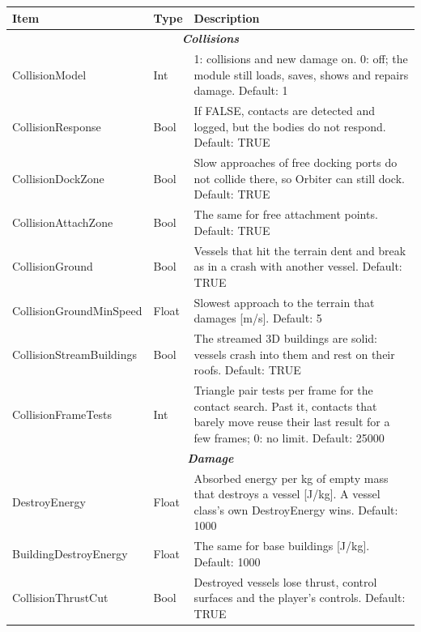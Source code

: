 \documentclass[Orbiter User Manual.tex]{subfiles}
\begin{document}
	\begin{longtable}{ |p{}|p{}|p{}| }
	\hline\rule{0pt}{2ex}
	\textbf{Item} & \textbf{Type} & \textbf{Description}\\
	\hline
	\multicolumn{3}{|c|}{\rule{0pt}{2ex}\textbf{\textit{Collisions}}}\\
	\hline\rule{0pt}{2ex}
	CollisionModel & Int & 1: collisions and new damage on. 0: off; the module still loads, saves, shows and repairs damage. Default: 1\\
	\hline\rule{0pt}{2ex}
	CollisionResponse & Bool & If FALSE, contacts are detected and logged, but the bodies do not respond. Default: TRUE\\
	\hline\rule{0pt}{2ex}
	CollisionDockZone & Bool & Slow approaches of free docking ports do not collide there, so Orbiter can still dock. Default: TRUE\\
	\hline\rule{0pt}{2ex}
	CollisionAttachZone & Bool & The same for free attachment points. Default: TRUE\\
	\hline\rule{0pt}{2ex}
	CollisionGround & Bool & Vessels that hit the terrain dent and break as in a crash with another vessel. Default: TRUE\\
	\hline\rule{0pt}{2ex}
	CollisionGroundMinSpeed & Float & Slowest approach to the terrain that damages [m/s]. Default: 5\\
	\hline\rule{0pt}{2ex}
	CollisionStreamBuildings & Bool & The streamed 3D buildings are solid: vessels crash into them and rest on their roofs. Default: TRUE\\
	\hline\rule{0pt}{2ex}
	CollisionFrameTests & Int & Triangle pair tests per frame for the contact search. Past it, contacts that barely move reuse their last result for a few frames; 0: no limit. Default: 25000\\
	\hline
	\multicolumn{3}{|c|}{\rule{0pt}{2ex}\textbf{\textit{Damage}}}\\
	\hline\rule{0pt}{2ex}
	DestroyEnergy & Float & Absorbed energy per kg of empty mass that destroys a vessel [J/kg]. A vessel class's own DestroyEnergy wins. Default: 1000\\
	\hline\rule{0pt}{2ex}
	BuildingDestroyEnergy & Float & The same for base buildings [J/kg]. Default: 1000\\
	\hline\rule{0pt}{2ex}
	CollisionThrustCut & Bool & Destroyed vessels lose thrust, control surfaces and the player's controls. Default: TRUE\\

\end{longtable}
\end{document}
